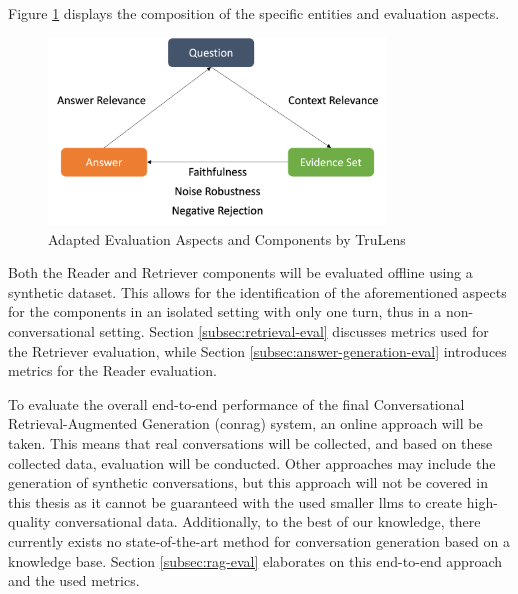 Figure \ref{fig:evaluation-dimensions} displays the composition of the specific entities and evaluation aspects.

\begin{figure}[H]
    \centering
    \includegraphics[width=0.8\textwidth]{Grafiken/Evaluation_Dimensions_RAGAS_Turelens.png}
    \caption{Adapted Evaluation Aspects and Components by TruLens \cite{noauthor_truelens}}
    \label{fig:evaluation-dimensions}
\end{figure}

Both the Reader and Retriever components will be evaluated offline using a synthetic dataset. This allows for the identification of the aforementioned aspects for the components in an isolated setting with only one turn, thus in a non-conversational setting. Section \ref{subsec:retrieval-eval} discusses metrics used for the Retriever evaluation, while Section \ref{subsec:answer-generation-eval} introduces metrics for the Reader evaluation.

To evaluate the overall end-to-end performance of the final Conversational Retrieval-Augmented Generation (\gls{conrag}) system, an online approach will be taken. This means that real conversations will be collected, and based on these collected data, evaluation will be conducted. Other approaches may include the generation of synthetic conversations, but this approach will not be covered in this thesis as it cannot be guaranteed with the used smaller \gls{llm}s to create high-quality conversational data. Additionally, to the best of our knowledge, there currently exists no state-of-the-art method for conversation generation based on a knowledge base. Section \ref{subsec:rag-eval} elaborates on this end-to-end approach and the used metrics.


